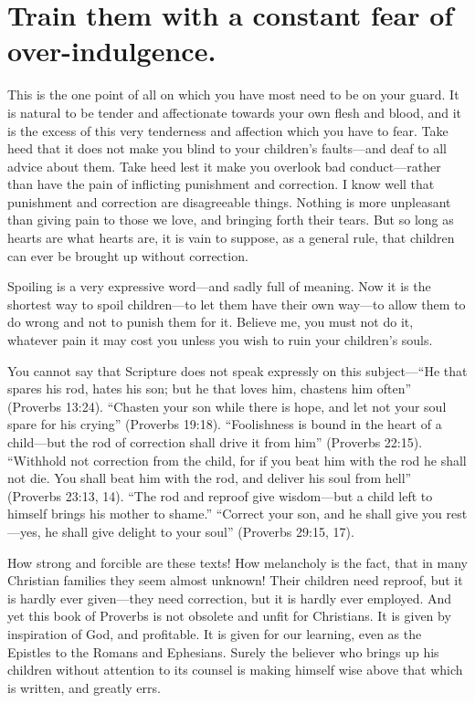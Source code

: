 \documentclass[
]{book}
\begin{document}
\hypertarget{train-them-with-a-constant-fear-of-over-indulgence.}{%
\chapter{Train them with a constant fear of over-indulgence.}\label{train-them-with-a-constant-fear-of-over-indulgence.}}

This is the one point of all on which you have most need to be on your guard. It is natural to be tender and affectionate towards your own flesh and blood, and it is the excess of this very tenderness and affection which you have to fear. Take heed that it does not make you blind to your children's faults---and deaf to all advice about them. Take heed lest it make you overlook bad conduct---rather than have the pain of inflicting punishment and correction. I know well that punishment and correction are disagreeable things. Nothing is more unpleasant than giving pain to those we love, and bringing forth their tears. But so long as hearts are what hearts are, it is vain to suppose, as a general rule, that children can ever be brought up without correction.

Spoiling is a very expressive word---and sadly full of meaning. Now it is the shortest way to spoil children---to let them have their own way---to allow them to do wrong and not to punish them for it. Believe me, you must not do it, whatever pain it may cost you unless you wish to ruin your children's souls.

You cannot say that Scripture does not speak expressly on this subject---``He that spares his rod, hates his son; but he that loves him, chastens him often'' (Proverbs 13:24). ``Chasten your son while there is hope, and let not your soul spare for his crying'' (Proverbs 19:18). ``Foolishness is bound in the heart of a child---but the rod of correction shall drive it from him'' (Proverbs 22:15). ``Withhold not correction from the child, for if you beat him with the rod he shall not die. You shall beat him with the rod, and deliver his soul from hell'' (Proverbs 23:13, 14). ``The rod and reproof give wisdom---but a child left to himself brings his mother to shame.'' ``Correct your son, and he shall give you rest---yes, he shall give delight to your soul'' (Proverbs 29:15, 17).

How strong and forcible are these texts! How melancholy is the fact, that in many Christian families they seem almost unknown! Their children need reproof, but it is hardly ever given---they need correction, but it is hardly ever employed. And yet this book of Proverbs is not obsolete and unfit for Christians. It is given by inspiration of God, and profitable. It is given for our learning, even as the Epistles to the Romans and Ephesians. Surely the believer who brings up his children without attention to its counsel is making himself wise above that which is written, and greatly errs.
\end{document}
